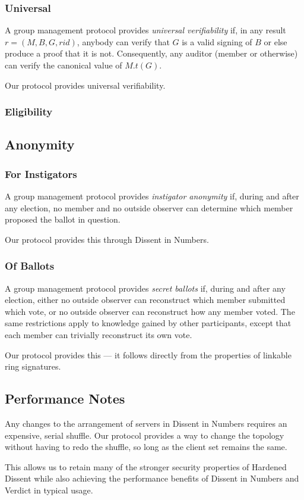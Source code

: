    \subsubsection{Universal}
    A group management protocol provides \emph{universal verifiability} if, in
    any result $r = (M, B, G, rid)$, anybody can verify that $G$ is a valid
    signing of $B$ or else produce a proof that it is not. Consequently, any
    auditor (member or otherwise) can verify the canonical value of $M.t(G)$.

    Our protocol provides universal verifiability.%

    \subsubsection{Eligibility}
  \subsection{Anonymity}
    \subsubsection{For Instigators}
    A group management protocol provides \emph{instigator anonymity} if, during
    and after any election, no member and no outside observer can determine
    which member proposed the ballot in question.

    Our protocol provides this through Dissent in Numbers.
    \subsubsection{Of Ballots}
    A group management protocol provides \emph{secret ballots} if, during and
    after any election, either no outside observer can reconstruct which member
    submitted which vote, or no outside observer can reconstruct how any
    member voted. The same restrictions apply to knowledge gained by other
    participants, except that each member can trivially reconstruct its own vote.

    Our protocol provides this --- it follows directly from the properties of
    linkable ring signatures.
\subsection{Performance Notes}
Any changes to the arrangement of servers in Dissent in Numbers requires an
expensive, serial shuffle. Our protocol provides a way to change the topology
without having to redo the shuffle, so long as the client set remains the same.

This allows us to retain many of the stronger security properties of Hardened
Dissent\cite{sec} while also achieving the performance benefits
of Dissent in Numbers and Verdict in typical usage.

